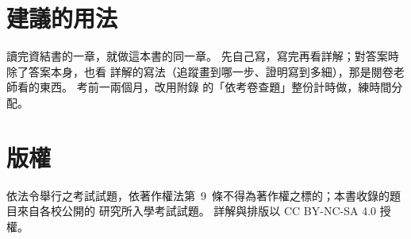 \section*{建議的用法}

讀完資結書的一章，就做這本書的同一章。 先自己寫，寫完再看詳解；對答案時除了答案本身，也看
詳解的寫法（追蹤畫到哪一步、證明寫到多細），那是閱卷老師看的東西。 考前一兩個月，改用附錄
的「依考卷查題」整份計時做，練時間分配。

\section*{版權}

依法令舉行之考試試題，依著作權法第~9~條不得為著作權之標的；本書收錄的題目來自各校公開的
研究所入學考試試題。 詳解與排版以 CC BY-NC-SA 4.0 授權。
